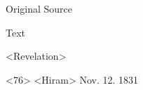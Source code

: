 {				%
			
			\begin{description}
				\item[Original Source]
			\end{description}
			
			
			\begin{description}
				\item[Text]
			\end{description}
			
				\begin{tightcenter}
				<Revelation>
				\end{tightcenter}
				
				<76> <Hiram> Nov. 12. 1831
				
}
